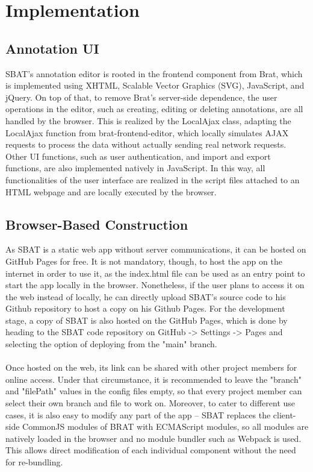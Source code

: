 \documentclass[12ptm a4paper]{article}
\begin{document}
\newpage
\section{Implementation}
\subsection{Annotation UI}
SBAT's annotation editor is rooted in the frontend component from Brat, which is implemented using XHTML, Scalable Vector Graphics (SVG), JavaScript, and jQuery. On top of that, to remove Brat's server-side dependence, the user operations in the editor, such as creating, editing or deleting annotations, are all handled by the browser. This is realized by the LocalAjax class, adapting the LocalAjax function from brat-frontend-editor, which locally simulates AJAX requests to process the data without actually sending real network requests. Other UI functions, such as user authentication, and import and export functions, are also implemented natively in JavaScript. In this way, all functionalities of the user interface are realized in the script files attached to an HTML webpage and are locally executed by the browser.
\subsection{Browser-Based Construction}
As SBAT is a static web app without server communications, it can be hosted on GitHub Pages for free. It is not mandatory, though, to host the app on the internet in order to use it, as the index.html file can be used as an entry point to start the app locally in the browser. Nonetheless, if the user plans to access it on the web instead of locally, he can directly upload SBAT's source code to his Github repository to host a copy on his Github Pages. For the development stage, a copy of SBAT is also hosted on the GitHub Pages, which is done by heading to the SBAT code repository on GitHub -> Settings -> Pages and selecting the option of deploying from the "main" branch.\\
\\
Once hosted on the web, its link can be shared with other project members for online access. Under that circumstance, it is recommended to leave the "branch" and "filePath" values in the config files empty, so that every project member can select their own branch and file to work on. Moreover, to cater to different use cases, it is also easy to modify any part of the app -- SBAT replaces the client-side CommonJS modules of BRAT with ECMAScript modules, so all modules are natively loaded in the browser and no module bundler such as Webpack is used. This allows direct modification of each individual component without the need for re-bundling.
\end{document}
